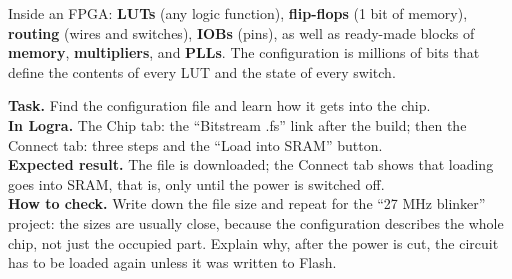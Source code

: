 \begin{ideabox}
Inside an FPGA: \textbf{LUTs} (any logic function), \textbf{flip-flops}
(1 bit of memory), \textbf{routing} (wires and switches), \textbf{IOBs}
(pins), as well as ready-made blocks of \textbf{memory}, \textbf{multipliers}, and
\textbf{PLLs}. The configuration is millions of bits that define
the contents of every LUT and the state of every switch.
\end{ideabox}

\begin{diybox}
\textbf{Task.} Find the configuration file and learn how it gets into the chip.\\
\textbf{In Logra.} The Chip tab: the ``Bitstream .fs'' link after the build; then the Connect tab: three steps and the ``Load into SRAM'' button.\\
\textbf{Expected result.} The  file is downloaded; the Connect tab shows that loading goes into SRAM, that is, only until the power is switched off.\\
\textbf{How to check.} Write down the file size and repeat for the ``27 MHz blinker'' project: the sizes are usually close, because the configuration describes the whole chip, not just the occupied part.  Explain why, after the power is cut, the circuit has to be loaded again unless it was written to Flash.
\end{diybox}
